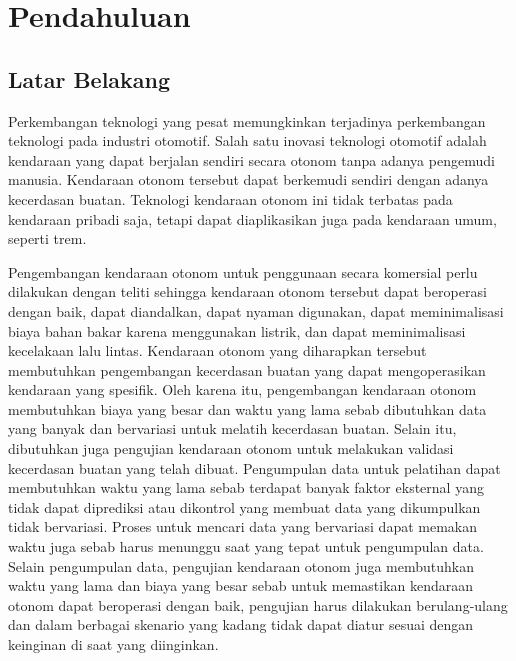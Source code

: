\chapter{Pendahuluan}


\section{Latar Belakang}

Perkembangan teknologi yang pesat memungkinkan terjadinya perkembangan teknologi
pada industri otomotif. Salah satu inovasi teknologi otomotif adalah kendaraan
yang dapat berjalan sendiri secara otonom tanpa adanya pengemudi manusia.
Kendaraan otonom tersebut dapat berkemudi sendiri dengan adanya kecerdasan
buatan. Teknologi kendaraan otonom ini tidak terbatas pada kendaraan pribadi
saja, tetapi dapat diaplikasikan juga pada kendaraan umum, seperti trem.

Pengembangan kendaraan otonom untuk penggunaan secara komersial perlu dilakukan
dengan teliti sehingga kendaraan otonom tersebut dapat beroperasi dengan baik,
dapat diandalkan, dapat nyaman digunakan, dapat meminimalisasi biaya bahan bakar
karena menggunakan listrik, dan dapat meminimalisasi kecelakaan lalu lintas.
Kendaraan otonom yang diharapkan tersebut membutuhkan pengembangan kecerdasan
buatan yang dapat mengoperasikan kendaraan yang spesifik. Oleh karena itu,
pengembangan kendaraan otonom membutuhkan biaya yang besar dan waktu yang lama
sebab dibutuhkan data yang banyak dan bervariasi untuk melatih kecerdasan
buatan. Selain itu, dibutuhkan juga pengujian kendaraan otonom untuk melakukan
validasi kecerdasan buatan yang telah dibuat. Pengumpulan data untuk pelatihan
dapat membutuhkan waktu yang lama sebab terdapat banyak faktor eksternal yang
tidak dapat diprediksi atau dikontrol yang membuat data yang dikumpulkan tidak
bervariasi. Proses untuk mencari data yang bervariasi dapat memakan waktu juga
sebab harus menunggu saat yang tepat untuk pengumpulan data. Selain pengumpulan
data, pengujian kendaraan otonom juga membutuhkan waktu yang lama dan biaya yang
besar sebab untuk memastikan kendaraan otonom dapat beroperasi dengan baik,
pengujian harus dilakukan berulang-ulang dan dalam berbagai skenario yang kadang
tidak dapat diatur sesuai dengan keinginan di saat yang diinginkan.

